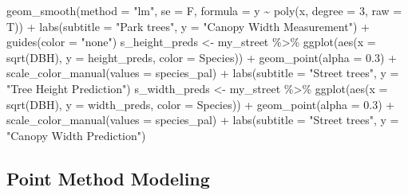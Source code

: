 \documentclass[12pt,twoside]{reedthesis}
\newenvironment{Shaded}{\begin{snugshade}}{\end{snugshade}}
\newcommand{\AttributeTok}[1]{\textcolor[rgb]{0.77,0.63,0.00}{#1}}
\newcommand{\DecValTok}[1]{\textcolor[rgb]{0.00,0.00,0.81}{#1}}
\newcommand{\FloatTok}[1]{\textcolor[rgb]{0.00,0.00,0.81}{#1}}
\newcommand{\FunctionTok}[1]{\textcolor[rgb]{0.00,0.00,0.00}{#1}}
\newcommand{\NormalTok}[1]{#1}
\newcommand{\OtherTok}[1]{\textcolor[rgb]{0.56,0.35,0.01}{#1}}
\newcommand{\SpecialCharTok}[1]{\textcolor[rgb]{0.00,0.00,0.00}{#1}}
\newcommand{\StringTok}[1]{\textcolor[rgb]{0.31,0.60,0.02}{#1}}
\begin{document}
\begin{Shaded}
\begin{Highlighting}[]
    \FunctionTok{geom\_smooth}\NormalTok{(}\AttributeTok{method =} \StringTok{"lm"}\NormalTok{, }\AttributeTok{se =}\NormalTok{ F, }\AttributeTok{formula =}\NormalTok{ y }\SpecialCharTok{\textasciitilde{}} \FunctionTok{poly}\NormalTok{(x,}
        \AttributeTok{degree =} \DecValTok{3}\NormalTok{, }\AttributeTok{raw =}\NormalTok{ T)) }\SpecialCharTok{+} \FunctionTok{labs}\NormalTok{(}\AttributeTok{subtitle =} \StringTok{"Park trees"}\NormalTok{,}
    \AttributeTok{y =} \StringTok{"Canopy Width Measurement"}\NormalTok{) }\SpecialCharTok{+} \FunctionTok{guides}\NormalTok{(}\AttributeTok{color =} \StringTok{"none"}\NormalTok{)}
\NormalTok{s\_height\_preds }\OtherTok{\textless{}{-}}\NormalTok{ my\_street }\SpecialCharTok{\%\textgreater{}\%}
    \FunctionTok{ggplot}\NormalTok{(}\FunctionTok{aes}\NormalTok{(}\AttributeTok{x =} \FunctionTok{sqrt}\NormalTok{(DBH), }\AttributeTok{y =}\NormalTok{ height\_preds, }\AttributeTok{color =}\NormalTok{ Species)) }\SpecialCharTok{+}
    \FunctionTok{geom\_point}\NormalTok{(}\AttributeTok{alpha =} \FloatTok{0.3}\NormalTok{) }\SpecialCharTok{+} \FunctionTok{scale\_color\_manual}\NormalTok{(}\AttributeTok{values =}\NormalTok{ species\_pal) }\SpecialCharTok{+}
    \FunctionTok{labs}\NormalTok{(}\AttributeTok{subtitle =} \StringTok{"Street trees"}\NormalTok{, }\AttributeTok{y =} \StringTok{"Tree Height Prediction"}\NormalTok{)}
\NormalTok{s\_width\_preds }\OtherTok{\textless{}{-}}\NormalTok{ my\_street }\SpecialCharTok{\%\textgreater{}\%}
    \FunctionTok{ggplot}\NormalTok{(}\FunctionTok{aes}\NormalTok{(}\AttributeTok{x =} \FunctionTok{sqrt}\NormalTok{(DBH), }\AttributeTok{y =}\NormalTok{ width\_preds, }\AttributeTok{color =}\NormalTok{ Species)) }\SpecialCharTok{+}
    \FunctionTok{geom\_point}\NormalTok{(}\AttributeTok{alpha =} \FloatTok{0.3}\NormalTok{) }\SpecialCharTok{+} \FunctionTok{scale\_color\_manual}\NormalTok{(}\AttributeTok{values =}\NormalTok{ species\_pal) }\SpecialCharTok{+}
    \FunctionTok{labs}\NormalTok{(}\AttributeTok{subtitle =} \StringTok{"Street trees"}\NormalTok{, }\AttributeTok{y =} \StringTok{"Canopy Width Prediction"}\NormalTok{)}
\end{Highlighting}
\end{Shaded}
\normalsize

\hypertarget{point-method-modeling}{%
\subsection*{Point Method Modeling}\label{point-method-modeling}}
\end{document}
